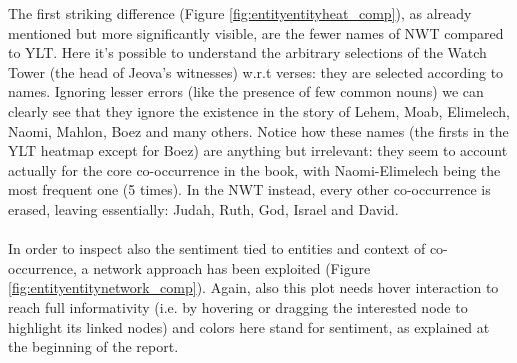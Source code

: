 \documentclass[sigchi]{article}
\begin{document}
The first striking difference (Figure \ref{fig:entityentityheat_comp}), as already mentioned but more significantly visible, are the fewer names of NWT compared to YLT. Here it’s possible to understand the arbitrary selections of the Watch Tower (the head of Jeova’s witnesses) w.r.t verses: they are selected according to names. Ignoring lesser errors (like the presence of few common nouns) we can clearly see that they ignore the existence in the story of Lehem, Moab, Elimelech, Naomi, Mahlon, Boez and many others. Notice how these names (the firsts in the YLT heatmap except for Boez) are anything but irrelevant:
they seem to account actually for the core co-occurrence in the book, with Naomi-Elimelech being the most frequent one (5 times). In the NWT instead, every other co-occurrence is erased, leaving essentially: Judah, Ruth, God, Israel and David. \\ \\

In order to inspect also the sentiment tied to entities and context of co-occurrence, a network approach has been exploited (Figure \ref{fig:entityentitynetwork_comp}). Again, also this plot needs hover interaction to reach full informativity (i.e. by hovering or dragging the interested node to highlight its linked nodes) and colors here stand for sentiment, as explained at the beginning of the report.\\ \\
\end{document}
